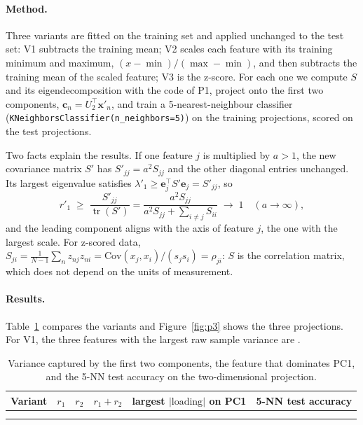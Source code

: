 \documentclass[11pt,a4paper]{article}
\makeatletter
\newcommand{\res}[1]{\@ifundefined{res@#1}{\textbf{??}}{\@nameuse{res@#1}}}
\newcommand{\resrows}[1]{\@ifundefined{res@#1}{\textbf{??} \\}{\@nameuse{res@#1}}}%
\newcommand{\T}{\top}
\newcommand{\x}{\mathbf{x}}
\newcommand{\cc}{\mathbf{c}}
\newcommand{\tr}{\operatorname{tr}}
\makeatother
\begin{document}
\paragraph{Method.} Three variants are fitted on the training set and applied unchanged to the
test set: V1 subtracts the training mean; V2 scales each feature with its training minimum and
maximum, $(x - \min)/(\max - \min)$, and then subtracts the training mean of the scaled feature;
V3 is the z-score. For each one we compute $S$ and its eigendecomposition with the code of P1, project
onto the first two components, $\cc_n = U_2^\T\x'_n$, and train a 5-nearest-neighbour classifier
(\texttt{KNeighborsClassifier(n\_neighbors=5)}) on the training projections, scored on the test
projections.

Two facts explain the results. If one feature $j$ is multiplied by $a > 1$, the new covariance
matrix $S'$ has $S'_{jj} = a^2S_{jj}$ and the other diagonal entries unchanged. Its largest
eigenvalue satisfies $\lambda'_1 \ge \mathbf e_j^\T S'\mathbf e_j = S'_{jj}$, so
\[
  r'_1 \;\ge\; \frac{S'_{jj}}{\tr(S')} = \frac{a^2S_{jj}}{a^2S_{jj} + \sum_{i\ne j}S_{ii}}
  \;\longrightarrow\; 1 \quad (a \to \infty),
\]
and the leading component aligns with the axis of feature $j$, the one with the largest scale.
For z-scored data,
$S_{ji} = \frac{1}{N-1}\sum_n z_{nj}z_{ni} = \mathrm{Cov}(x_j, x_i)/(s_js_i) = \rho_{ji}$: $S$ is
the correlation matrix, which does not depend on the units of measurement.

\paragraph{Results.} Table~\ref{tab:p3} compares the variants and Figure~\ref{fig:p3} shows the
three projections. For V1, the three features with the largest raw sample variance are
\res{p3-raw-list}.

\begin{table}[H]
  \centering\small
  \begin{tabular}{lccclc}
    \toprule
    Variant & $r_1$ & $r_2$ & $r_1 + r_2$ & largest $|\text{loading}|$ on PC1 & 5-NN test accuracy \\
    \midrule
    \resrows{p3-rows}
    \bottomrule
  \end{tabular}
  \caption{Variance captured by the first two components, the feature that dominates PC1, and
    the 5-NN test accuracy on the two-dimensional projection.}
  \label{tab:p3}
\end{table}
\end{document}
